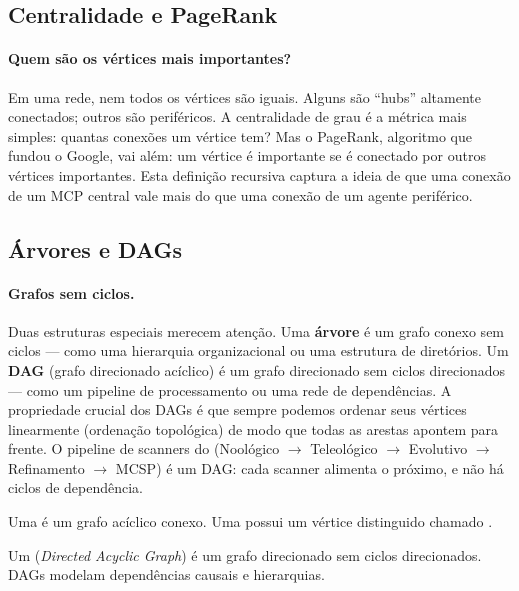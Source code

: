 \subsection{Centralidade e PageRank}

\paragraph{Quem são os vértices mais importantes?} Em uma rede, nem todos os
vértices são iguais. Alguns são ``hubs'' altamente conectados; outros são
periféricos. A centralidade de grau é a métrica mais simples: quantas
conexões um vértice tem? Mas o PageRank, algoritmo que fundou o Google, vai
além: um vértice é importante se é conectado por outros vértices importantes.
Esta definição recursiva captura a ideia de que uma conexão de um MCP central
vale mais do que uma conexão de um agente periférico.

\subsection{Árvores e DAGs}

\paragraph{Grafos sem ciclos.} Duas estruturas especiais merecem atenção.
Uma \textbf{árvore} é um grafo conexo sem ciclos --- como uma hierarquia
organizacional ou uma estrutura de diretórios. Um \textbf{DAG} (grafo
direcionado acíclico) é um grafo direcionado sem ciclos direcionados ---
como um pipeline de processamento ou uma rede de dependências. A propriedade
crucial dos DAGs é que sempre podemos ordenar seus vértices linearmente
(ordenação topológica) de modo que todas as arestas apontem para frente.
O pipeline de scanners do \opencodeeco{} (Noológico $\to$ Teleológico $\to$
Evolutivo $\to$ Refinamento $\to$ MCSP) é um DAG: cada scanner alimenta o
próximo, e não há ciclos de dependência.

\begin{definicao}[Árvore]
    Uma  é um grafo acíclico conexo. Uma  possui um vértice distinguido chamado .
\end{definicao}

\begin{definicao}[DAG]
    Um  (\textit{Directed Acyclic Graph}) é um grafo
    direcionado sem ciclos direcionados. DAGs modelam dependências causais
    e hierarquias.
\end{definicao}

